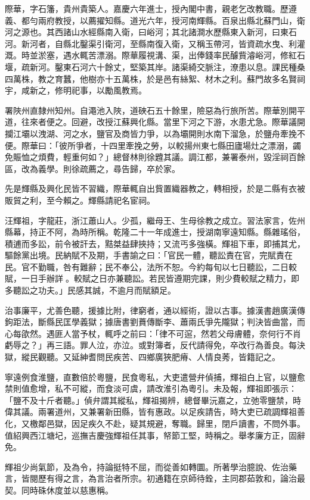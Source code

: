 \begin{pinyinscope}
際華，字石籓，貴州貴築人。嘉慶六年進士，授內閣中書，親老乞改教職。歷遵義、都勻兩府教授，以薦擢知縣。道光六年，授河南輝縣。百泉出縣北蘇門山，衛河之源也。其西諸山水經縣南入衛，曰峪河；其北諸澗水歷縣東入新河，曰東石河。新河者，自縣北鑿渠引衛河，至縣南復入衛，又稱玉帶河，皆資疏水曳、利灌溉。時並淤塞，遇水輒苦漂溺。際華履視溝、渠，出俸錢率民醵貲濬峪河，修紅石堰，疏新河。鑿東石河六十餘丈，堅築其岸。諸渠綺交脈注，潦患以息。課民種桑四萬株，教之育蠶，他樹亦十五萬株，於是邑有絲絮、材木之利。蘇門故多名賢祠宇，咸新之，修明祀事，以勵風教焉。

署陜州直隸州知州。自澠池入陜，道硤石五十餘里，險惡為行旅所苦。際華別開平道，往來者便之。回避，改授江蘇興化縣。當里下河之下游，水患尤急。際華議開攔江壩以洩湖、河之水，鹽官及商皆力爭，以為壩開則水南下溜急，於鹽舟牽挽不便。際華曰：「彼所爭者，十四里牽挽之勞，以較揚州東七縣田廬場灶之漂溺，蠲免賑恤之煩費，輕重何如？」總督林則徐韙其議。調江都，兼署泰州，毀淫祠百餘區，改為義學。則徐疏薦之，尋告歸，卒於家。

先是輝縣及興化民皆不習織，際華輒自出貲置織器教之，轉相授，於是二縣有衣被販貿之利，至今賴之。輝縣請祀名宦祠。

汪輝祖，字龍莊，浙江蕭山人。少孤，繼母王、生母徐教之成立。習法家言，佐州縣幕，持正不阿，為時所稱。乾隆二十一年成進士，授湖南寧遠知縣。縣雜瑤俗，積逋而多訟，前令被訐去，黠桀益肆挾持；又流丐多強橫。輝祖下車，即捕其尤，驅餘黨出境。民納賦不及期，手書諭之曰：「官民一體，聽訟責在官，完賦責在民。官不勤職，咎有難辭；民不奉公，法所不恕。今約每旬以七日聽訟，二日較賦，一日手辦詳。較賦之日亦兼聽訟。若民皆遵期完課，則少費較賦之精力，即多聽訟之功夫。」民感其誠，不逾月而賦額足。

治事廉平，尤善色聽，援據比附，律窮者，通以經術，證以古事。據漢書趙廣漢傳鉤距法，斷縣民匡學義獄；據唐書劉蕡傳斷李、蕭兩氏爭先隴獄；判決皆曲當，而心每欿然。遇匪人當予杖，輒呼之前曰：「律不可逭，然若父母膚體，奈何行不肖虧辱之？」再三語。罪人泣，亦泣。或對簿者，反代請得免，卒改行為善良。每決獄，縱民觀聽。又延紳耆問民疾苦、四鄉廣狹肥瘠、人情良莠，皆籍記之。

寧遠例食淮鹽，直數倍於粵鹽，民食粵私，大吏遣營弁偵捕，輝祖白上官，以鹽愈禁則值愈增，私不可縱，而食淡可虞，請改淮引為粵引。未及報，輝祖即張示：「鹽不及十斤者聽。」偵弁謂其縱私，輝祖揭辨，總督畢沅嘉之，立弛零鹽禁，時偉其議。兩署道州，又兼署新田縣，皆有惠政。以足疾請告，時大吏已疏調輝祖善化，又檄鄰邑獄，因足疾久不赴，疑其規避，奪職。歸里，閉戶讀書，不問外事。值紹興西江塘圮，巡撫吉慶強輝祖任其事，帑節工堅，時稱之。舉孝廉方正，固辭免。

輝祖少尚氣節，及為令，持論挺特不屈，而從善如轉圜。所著學治臆說、佐治藥言，皆閱歷有得之言，為言治者所宗。初通籍在京師待銓，主同郡茹敦和，論治最契。同時硃休度並以慈惠稱。


\end{pinyinscope}
